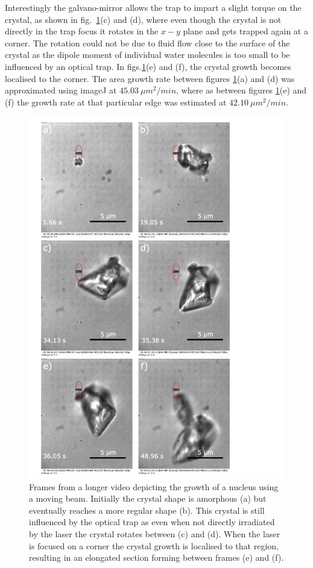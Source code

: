 Interestingly the galvano-mirror allows the trap to impart a slight torque 
on the crystal, as shown in fig.~\ref{fig:eliptical_beam_1}(c) and (d), 
where even though the crystal is not directly in the trap focus it rotates 
in the $x-y$ plane and gets trapped again at a corner. The rotation could 
not be due to fluid flow close to the surface of the crystal as the dipole 
moment of individual water molecules is too small to be influenced by an 
optical trap. In figs.\ref{fig:eliptical_beam_1}(e) and (f), the crystal 
growth becomes localised to the corner. The area growth rate between figures \ref{fig:eliptical_beam_1}(a) and (d) was approximated using imageJ at $45.03\ 
\mu m^2 /min$, where as between figures \ref{fig:eliptical_beam_1}(e) and 
(f) the growth rate at that particular edge was estimated at $42.10\ \mu m^2/min$. 
\begin{figure}[h!]
	\centering
	\includegraphics[width=0.85\linewidth]{frames_eliptical_beam.pdf}
	\caption{Frames from a longer video depicting the growth of a nucleus using 
		a moving beam. Initially the crystal shape is amorphous (a) but eventually
		reaches a more regular shape (b). This crystal is still influenced by the
		optical trap as even when not directly irradiated by the laser the crystal
		rotates between (c) and (d). When the laser is focused on a corner the 
		crystal growth is localised to that region, resulting in an elongated 
		section forming between frames (e) and (f).}
	\label{fig:eliptical_beam_1}
\end{figure}
 
